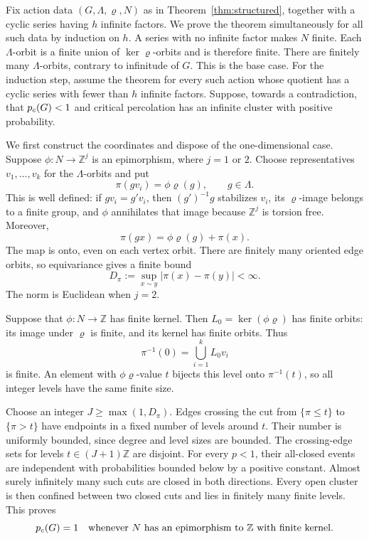 Fix action data \((G,\Lambda,\varrho,N)\) as in
Theorem~\ref{thm:structured}, together with a cyclic series having
\(h\) infinite factors. We prove the theorem simultaneously for all
such data by induction on \(h\). A series with no infinite factor
makes \(N\) finite. Each $\Lambda$-orbit is a finite union of
$\ker\varrho$-orbits and is therefore finite. There are finitely
many $\Lambda$-orbits, contrary to infinitude of $G$.
This is the base case. For the induction step, assume the theorem
for every such action whose quotient has a cyclic series with fewer
than \(h\) infinite factors. Suppose, towards a contradiction, that
\(p_c(G)<1\) and critical percolation has an infinite cluster with
positive probability.

We first construct the coordinates and dispose of the one-dimensional
case. Suppose $\phi:N\to\mathbb Z^j$ is an epimorphism, where $j=1$ or $2$.
Choose representatives $v_1,\ldots,v_k$ for the $\Lambda$-orbits and
put
\begin{equation}\label{eq:equivariant-projection}
 \pi(gv_i)=\phi\varrho(g),\qquad g\in\Lambda.
\end{equation}
This is well defined: if $gv_i=g'v_i$, then $(g')^{-1}g$ stabilizes
$v_i$, its $\varrho$-image belongs to a finite group, and $\phi$
annihilates that image because $\mathbb Z^j$ is torsion free. Moreover,
\begin{equation}\label{eq:projection-equivariance}
 \pi(gx)=\phi\varrho(g)+\pi(x).
\end{equation}
The map is onto, even on each vertex orbit. There are finitely many
oriented edge orbits, so equivariance gives a finite bound
\begin{equation}\label{eq:projection-edge-bound}
 D_\pi:=\sup_{x\sim y}|\pi(x)-\pi(y)|<\infty.
\end{equation}
The norm is Euclidean when $j=2$.

Suppose that $\phi:N\to\mathbb Z$ has finite kernel.
Then $L_0=\ker(\phi\varrho)$ has finite orbits: its image under
$\varrho$ is finite, and its kernel has finite orbits. Thus
\[
 \pi^{-1}(0)=\bigcup_{i=1}^k L_0v_i
\]
is finite. An element with $\phi\varrho$-value $t$ bijects this level
onto $\pi^{-1}(t)$, so all integer levels have the same finite size.

Choose an integer $J\ge\max(1,D_\pi)$. Edges crossing the cut from
$\{\pi\le t\}$ to $\{\pi>t\}$ have endpoints in a fixed number of
levels around $t$. Their number is uniformly bounded, since degree
and level sizes are bounded. The crossing-edge sets for levels
$t\in(J+1)\mathbb Z$ are disjoint. For every $p<1$, their all-closed
events are independent with probabilities bounded below by a positive
constant. Almost surely infinitely many such cuts are closed in both
directions. Every open cluster is then confined between two closed
cuts and lies in finitely many finite levels. This proves
\begin{equation}\label{eq:cyclic-critical-one}
 p_c(G)=1
 \quad\text{whenever $N$ has an epimorphism to $\mathbb Z$
 with finite kernel.}
\end{equation}

